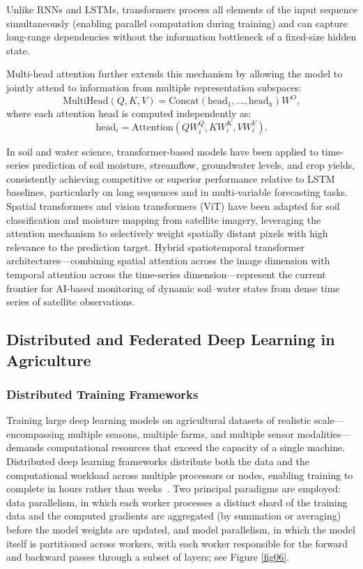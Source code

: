 \documentclass[land,review,accept,pdftex,oneauthor]{Definitions/mdpi}
\begin{document}
Unlike RNNs and LSTMs, transformers process all elements of the input sequence simultaneously (enabling parallel computation during training) and can capture long-range dependencies without the information bottleneck of a fixed-size hidden state.

Multi-head attention further extends this mechanism by allowing the model to jointly attend to information from multiple representation subspaces:
\begin{equation}
\text{MultiHead}(Q,K,V)
=
\text{Concat}
(\text{head}_1,\dots,\text{head}_h)W^O,
\end{equation}
where each attention head is computed independently as:
\begin{equation}
\text{head}_i
=
\text{Attention}
(QW_i^Q,KW_i^K,VW_i^V).
\end{equation}

In soil and water science, transformer-based models have been applied to time-series prediction of soil moisture, streamflow, groundwater levels, and crop yields, consistently achieving competitive or superior performance relative to LSTM baselines, particularly on long sequences and in multi-variable forecasting tasks. Spatial transformers and vision transformers (ViT) \citep{dosovitskiy2021image} have been adapted for soil classification and moisture mapping from satellite imagery, leveraging the attention mechanism to selectively weight spatially distant pixels with high relevance to the prediction target. Hybrid spatiotemporal transformer architectures---combining spatial attention across the image dimension with temporal attention across the time-series dimension---represent the current frontier for AI-based monitoring of dynamic soil--water states from dense time series of satellite observations.

\subsection{Distributed and Federated Deep Learning in Agriculture}

\subsubsection{Distributed Training Frameworks}

Training large deep learning models on agricultural datasets of realistic scale---encompassing multiple seasons, multiple farms, and multiple sensor modalities---demands computational resources that exceed the capacity of a single machine. Distributed deep learning frameworks distribute both the data and the computational workload across multiple processors or nodes, enabling training to complete in hours rather than weeks~\citep{ben2019demystifying}. Two principal paradigms are employed: data parallelism, in which each worker processes a distinct shard of the training data and the computed gradients are aggregated (by summation or averaging) before the model weights are updated, and model parallelism, in which the model itself is partitioned across workers, with each worker responsible for the forward and backward passes through a subset of layers; see Figure \ref{fig06}.
\end{document}
